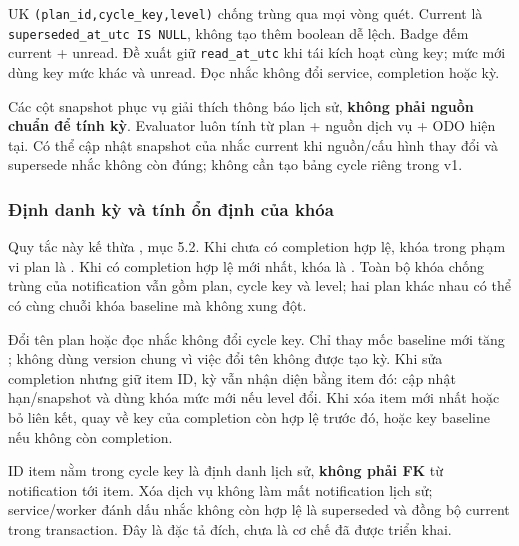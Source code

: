 UK \texttt{(plan\_\allowbreak{}id,\allowbreak{}cycle\_\allowbreak{}key,\allowbreak{}level)} chống trùng qua mọi vòng quét. Current là \texttt{superseded\_\allowbreak{}at\_\allowbreak{}utc IS NULL}, không tạo thêm boolean dễ lệch. Badge đếm current + unread. Đề xuất giữ \texttt{read\_\allowbreak{}at\_\allowbreak{}utc} khi tái kích hoạt cùng key; mức mới dùng key mức khác và unread. Đọc nhắc không đổi service, completion hoặc kỳ.\par
Các cột snapshot phục vụ giải thích thông báo lịch sử, \textbf{không phải nguồn chuẩn để tính kỳ}. Evaluator luôn tính từ plan + nguồn dịch vụ + ODO hiện tại. Có thể cập nhật snapshot của nhắc current khi nguồn/cấu hình thay đổi và supersede nhắc không còn đúng; không cần tạo bảng cycle riêng trong v1.\par
\subsubsection{Định danh kỳ và tính ổn định của khóa}\label{sec:cycle-key}
Quy tắc này kế thừa , mục 5.2. Khi chưa có completion hợp lệ, khóa trong phạm vi plan là . Khi có completion hợp lệ mới nhất, khóa là . Toàn bộ khóa chống trùng của notification vẫn gồm plan, cycle key và level; hai plan khác nhau có thể có cùng chuỗi khóa baseline mà không xung đột.

Đổi tên plan hoặc đọc nhắc không đổi cycle key. Chỉ thay mốc baseline mới tăng ; không dùng version chung vì việc đổi tên không được tạo kỳ. Khi sửa completion nhưng giữ item ID, kỳ vẫn nhận diện bằng item đó: cập nhật hạn/snapshot và dùng khóa mức mới nếu level đổi. Khi xóa item mới nhất hoặc bỏ liên kết, quay về key của completion còn hợp lệ trước đó, hoặc key baseline nếu không còn completion.

ID item nằm trong cycle key là định danh lịch sử, \textbf{không phải FK} từ notification tới item. Xóa dịch vụ không làm mất notification lịch sử; service/worker đánh dấu nhắc không còn hợp lệ là superseded và đồng bộ current trong transaction. Đây là đặc tả đích, chưa là cơ chế đã được triển khai.
